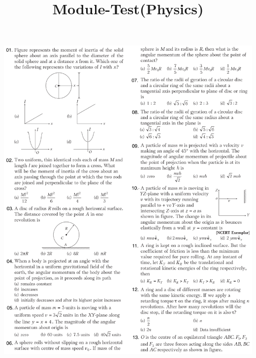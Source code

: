 \documentclass{article}
\title{Module-Test(Physics)\\[-15mm]}
\date{}
\begin{document}
\maketitle

\jeeSectionA

\includegraphics[trim={0.25cm 0 0 0},clip, width=170 mm]{1-13.png}
\end{document}
